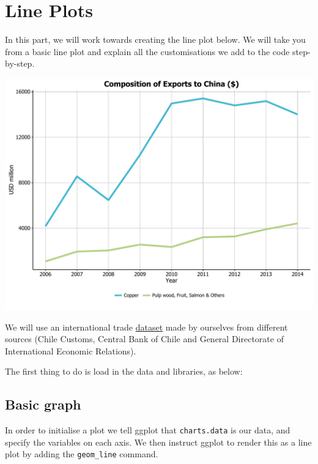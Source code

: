 \chapter{Line Plots}\label{line-plots}

In this part, we will work towards creating the line plot below. We will
take you from a basic line plot and explain all the customisations we
add to the code step-by-step.

\begin{center}\includegraphics[width=0.55\linewidth]{figures/line_final-1} \end{center}

We will use an international trade \href{http://pachamaltese.github.io/stats/trade-chile-china/copper-data-for-tutorial.csv}{dataset} made by ourselves from different sources (Chile Customs,
Central Bank of Chile and General Directorate of International Economic Relations).

The first thing to do is load in the data and libraries, as below:

\begin{Shaded}
\begin{Highlighting}[]

\StringTok{ }\NormalTok{(}\NormalTok{)}
\end{Highlighting}
\end{Shaded}

\section{Basic graph}\label{basic-graph}

In order to initialise a plot we tell ggplot that \texttt{charts.data}
is our data, and specify the variables on each axis. We then instruct
ggplot to render this as a line plot by adding the \texttt{geom\_line}
command.

